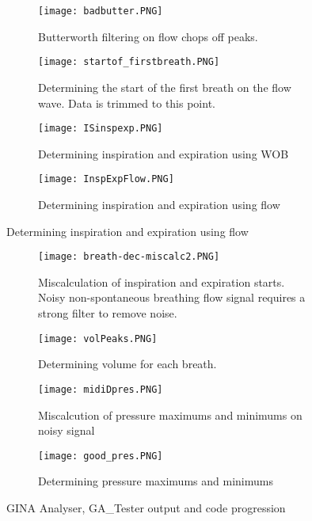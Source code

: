 \documentclass[12pt, openany, oneside]{book}
\begin{document}
\begin{figure}
	\begin{subfigure}[t]{0.49\textwidth}
		\centering
		\texttt{[image: badbutter.PNG]}		
		\caption{Butterworth filtering on flow chops off peaks.}
		\label{fig:badbutter}
	\end{subfigure}%
	\hfill
	\begin{subfigure}[t]{0.49\textwidth}
		\centering
		\texttt{[image: startof\_firstbreath.PNG]}		
		\caption[Determining the start of the first breath on the flow wave]{Determining the start of the first breath on the flow wave. Data is trimmed to this point.}
		\label{fig:startbreath}
	\end{subfigure}
	\medskip
	\begin{subfigure}[t]{0.49\textwidth}
		\centering
		\texttt{[image: ISinspexp.PNG]}		
		\caption{Determining inspiration and expiration using WOB}
		\label{fig:WOBcalc}
	\end{subfigure}%
	\hfill
	\begin{subfigure}[t]{0.49\textwidth}
		\centering
		\texttt{[image: InspExpFlow.PNG]}		
		\caption{Determining inspiration and expiration using flow}
		\label{fig:flowCalc}
	\end{subfigure}
\end{figure}

\begin{figure}\ContinuedFloat
	\begin{subfigure}[t]{0.49\textwidth}
		\centering
		\texttt{[image: breath-dec-miscalc2.PNG]}		
		\caption[Miscalculation of inspiration and expiration starts.]{Miscalculation of inspiration and expiration starts. Noisy non-spontaneous breathing flow signal requires a strong filter to remove noise.}
		\label{fig:miscalc}
	\end{subfigure}%
	\hfill
\begin{subfigure}[t]{0.49\textwidth}
		\centering
		\texttt{[image: volPeaks.PNG]}		
		\caption{Determining volume for each breath.}
		\label{fig:volP}
	\end{subfigure}	
	\medskip
	\begin{subfigure}[t]{0.49\textwidth}
		\centering
		\texttt{[image: midiDpres.PNG]}		
		\caption{Miscalcution of pressure maximums and minimums on noisy signal}
		\label{fig:pMM}
	\end{subfigure}%
	\hfill
	\begin{subfigure}[t]{0.49\textwidth}
		\centering
		\texttt{[image: good\_pres.PNG]}		
		\caption{Determining pressure maximums and minimums}
		\label{fig:goodpres}
	\end{subfigure}

\caption{GINA Analyser, GA\_Tester output and code progression}
\end{figure}
\end{document}
